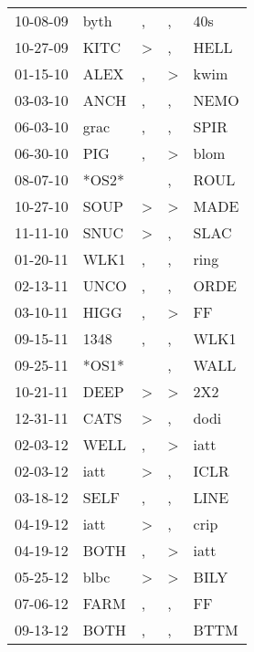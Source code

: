 \begin{supertabular}{lllll}
 10-08-09 &   byth &                , &                , &    40s \\
 10-27-09 &   KITC &     \textgreater &                , &   HELL \\
 01-15-10 &   ALEX &                , &     \textgreater &   kwim \\
 03-03-10 &   ANCH &                , &                , &   NEMO \\
 06-03-10 &   grac &                , &                , &   SPIR \\
 06-30-10 &    PIG &                , &     \textgreater &   blom \\
 08-07-10 &  *OS2* &                  &                , &   ROUL \\
 10-27-10 &   SOUP &     \textgreater &     \textgreater &   MADE \\
 11-11-10 &   SNUC &     \textgreater &                , &   SLAC \\
 01-20-11 &   WLK1 &                , &                , &   ring \\
 02-13-11 &   UNCO &                , &                , &   ORDE \\
 03-10-11 &   HIGG &                , &     \textgreater &     FF \\
 09-15-11 &   1348 &                , &                , &   WLK1 \\
 09-25-11 &  *OS1* &                  &                , &   WALL \\
 10-21-11 &   DEEP &     \textgreater &     \textgreater &    2X2 \\
 12-31-11 &   CATS &     \textgreater &                , &   dodi \\
 02-03-12 &   WELL &                , &     \textgreater &   iatt \\
 02-03-12 &   iatt &     \textgreater &                , &   ICLR \\
 03-18-12 &   SELF &                , &                , &   LINE \\
 04-19-12 &   iatt &     \textgreater &                , &   crip \\
 04-19-12 &   BOTH &                , &     \textgreater &   iatt \\
 05-25-12 &   blbc &     \textgreater &     \textgreater &   BILY \\
 07-06-12 &   FARM &                , &                , &     FF \\
 09-13-12 &   BOTH &                , &                , &   BTTM \\

\end{supertabular}
